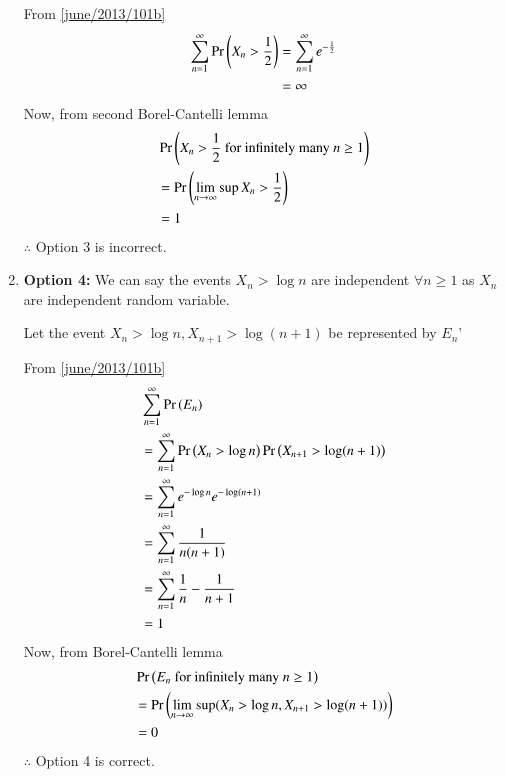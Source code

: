 \begin{enumerate}
    From \eqref{june/2013/101b}
    \begin{align}
        \sum_{n=1}^{\infty}\Pr\left(X_n > \frac{1}{2}\right) &= \sum_{n=1}^{\infty}e^{-\frac{1}{2}}\nonumber\\
                                            &= \infty\nonumber
    \end{align}
    Now, from second Borel-Cantelli lemma
    \begin{align}
        &\Pr\left(X_n>\frac{1}{2} \text{ for infinitely many }n\geq1\right)\nonumber\\
        &=\Pr\left(\lim_{n \rightarrow \infty}\sup X_n>\frac{1}{2}\right)\nonumber\\
        &=1\nonumber
    \end{align}
    $\therefore$ Option 3 is incorrect.
    \item \textbf{Option 4:} We can say the events $X_n>\log n$ are independent $\forall n\geq 1$ as $X_n$ are independent random variable.
    
    Let the event $X_n > \log n,X_{n+1}>\log (n+1)$ be represented by $E_n$'
    
    From \eqref{june/2013/101b}
    \begin{align}
        &\sum_{n=1}^{\infty}\Pr\left(E_n\right)\nonumber\\
        &= \sum_{n=1}^{\infty}\Pr\left(X_n>\log n\right)\Pr\left(X_{n+1}>\log (n+1)\right)\nonumber\\
        &=\sum_{n=1}^{\infty}e^{-\log n}e^{-\log (n+1)}\nonumber\\
        &=\sum_{n=1}^{\infty}\frac{1}{n(n+1)}\nonumber\\
        &=\sum_{n=1}^{\infty}\frac{1}{n}-\frac{1}{n+1}\nonumber\\
        &=1
    \end{align}
    Now, from Borel-Cantelli lemma
    \begin{align}
        &\Pr\left(E_n\text{ for infinitely many }n\geq1\right)\nonumber\\
        &=\Pr\left(\lim_{n \rightarrow \infty}\sup ( X_n>\log n,X_{n+1}>\log (n+1))\right)\nonumber\\
        &=0\nonumber
    \end{align}
    $\therefore$ Option 4 is correct.
\end{enumerate}
\vspace{0.5cm}\centering {}